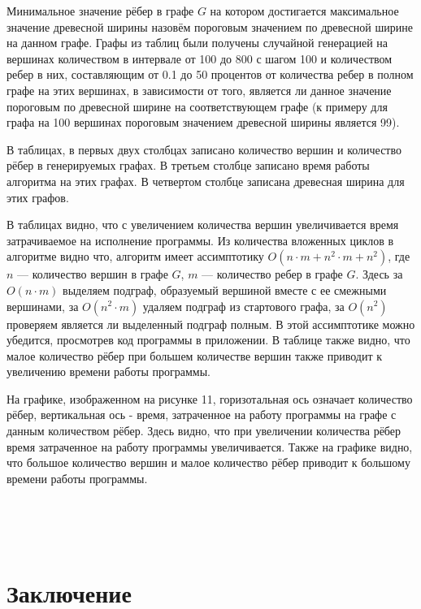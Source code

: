 \documentclass[a4paper,12pt]{article}
\begin{document}
\begin{large}
\begin{large}
		Минимальное значение рёбер в графе $G$ на котором достигается максимальное значение древесной ширины назовём пороговым значением по древесной ширине на данном графе.
		Графы из таблиц были получены случайной генерацией на вершинах количеством в интервале от 100 до 800 с шагом 100 и количеством ребер в них, составляющим от 0.1 до 50 процентов от количества ребер в полном графе на этих вершинах, в зависимости от того, является ли данное значение пороговым по древесной ширине на соответствующем графе (к примеру для графа на 100 вершинах пороговым значением древесной ширины является 99).

		В таблицах, в первых двух столбцах записано количество вершин и количество рёбер в генерируемых графах. В третьем столбце записано время работы алгоритма на этих графах. В четвертом столбце записана древесная ширина для этих графов.

		В таблицах видно, что с увеличением количества вершин увеличивается время затрачиваемое на исполнение программы.
		Из количества вложенных циклов в алгоритме видно что, алгоритм имеет ассимптотику $O(n \cdot m+n^2 \cdot m+n^2)$, где $n$ --- количество вершин в графе $G$,  $m$ --- количество ребер в графе $G$.
		Здесь за $O(n \cdot m)$ выделяем подграф, образуемый вершиной вместе с ее смежными вершинами, за $O(n^2 \cdot m)$ удаляем подграф из стартового графа, за $O(n^2)$ проверяем является ли выделенный подграф полным.
		В этой ассимптотике можно убедится, просмотрев код программы в приложении.
		В таблице также видно, что малое количество рёбер при большем количестве вершин также приводит к увеличению времени работы программы.

		На графике, изображенном на рисунке 11, горизотальная ось означает количество рёбер, вертикальная ось - время, затраченное на работу программы на графе с данным количеством рёбер.
		Здесь видно, что при увеличении количества рёбер время затраченное на работу программы увеличивается. Также на графике видно, что большое количество вершин и малое количество рёбер приводит к большому времени работы программы.

		\end{large}
		\newpage
		\\
		\\
		\\
		\section{Заключение}
		\renewcommand{\baselinestretch}{1.5}
		

\end{large}
\end{document}

